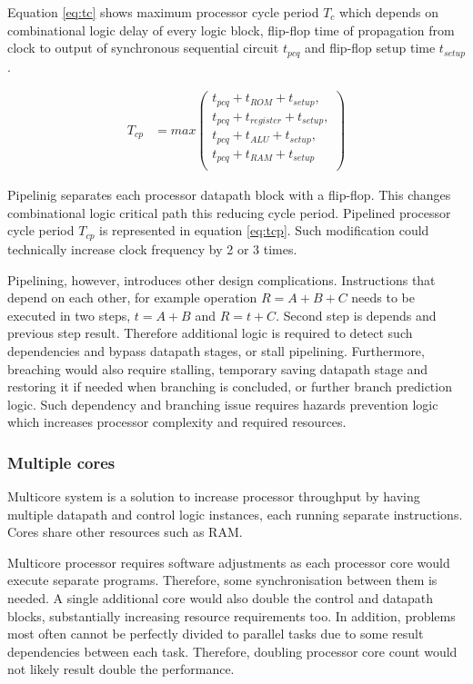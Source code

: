 Equation \ref{eq:tc} shows maximum processor cycle period $T_c$ which depends on combinational logic delay of every logic block, flip-flop time of propagation from clock to output of synchronous sequential circuit $t_{pcq}$ and flip-flop setup time $t_{setup}$.

\begin{align}\label{eq:tcp}
	T_{cp} &= max \left( \begin{matrix}
	t_{pcq} + t_{ROM} + t_{setup},\\
	t_{pcq} + t_{register} + t_{setup},\\
	t_{pcq} + t_{ALU} + t_{setup},\\
	t_{pcq} + t_{RAM} + t_{setup}\\
	\end{matrix}\right)
\end{align}

Pipelinig separates each processor datapath block with a flip-flop. This changes combinational logic critical path this reducing cycle period. Pipelined processor cycle period $T_{cp}$ is represented in equation \ref{eq:tcp}. Such modification could technically increase clock frequency by 2 or 3 times.

Pipelining, however, introduces other design complications. Instructions that depend on each other, for example operation $R = A + B + C$ needs to be executed in two steps, $t = A + B$ and $R = t + C$. Second step is depends and previous step result. Therefore additional logic is required to detect such dependencies and bypass datapath stages, or stall pipelining. Furthermore, breaching would also require stalling, temporary saving datapath stage and restoring it if needed when branching is concluded, or further branch prediction logic. Such dependency and branching issue requires hazards prevention logic which increases processor complexity and required resources. 

\subsubsection{Multiple cores}

Multicore system is a solution to increase processor throughput by having multiple datapath and control logic instances, each running separate instructions. Cores share other resources such as RAM.

Multicore processor requires software adjustments as each processor core would execute separate programs. Therefore, some synchronisation between them is needed. A single additional core would also double the control and datapath blocks, substantially increasing resource requirements too. In addition, problems most often cannot be perfectly divided to parallel tasks due to some result dependencies between each task. Therefore, doubling processor core count would not likely result double the performance. 

